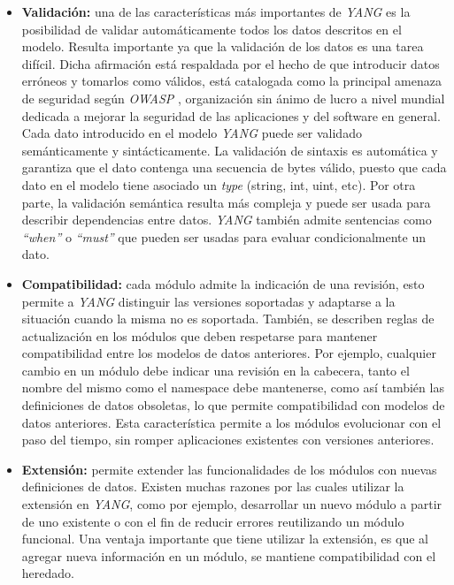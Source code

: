   \begin{itemize}
	\item \textbf{Validación:} una de las características más importantes de \textit{YANG} es la posibilidad de validar automáticamente todos los datos descritos en el modelo. Resulta importante ya que la validación de los datos es una tarea difícil. Dicha afirmación está respaldada por el hecho de que introducir datos erróneos y tomarlos como válidos, está catalogada como la principal amenaza de seguridad según \textit{OWASP} \parencite{owasp}, organización sin ánimo de lucro a nivel mundial dedicada a mejorar la seguridad de las aplicaciones y del software en general. Cada dato introducido en el modelo \textit{YANG} puede ser validado semánticamente y sintácticamente. La validación de sintaxis es automática y garantiza que el dato contenga una secuencia de bytes válido, puesto que cada dato en el modelo tiene asociado un \textit{type} (string, int, uint, etc). Por otra parte, la validación semántica resulta más compleja y puede ser usada para describir dependencias entre datos. \textit{YANG} también admite sentencias como \textit{“when”} o \textit{“must”} que pueden ser usadas para evaluar condicionalmente un dato.  
	\item \textbf{Compatibilidad:} cada módulo admite la indicación de una revisión, esto permite a \textit{YANG} distinguir las versiones soportadas y adaptarse a la situación cuando la misma no es soportada. También, se describen reglas de actualización en los módulos que deben respetarse para mantener compatibilidad entre los modelos de datos anteriores. Por ejemplo, cualquier cambio en un módulo debe indicar una revisión en la cabecera, tanto el nombre del mismo como el namespace debe mantenerse, como así también las definiciones de datos obsoletas, lo que permite compatibilidad con modelos de datos anteriores. Esta característica permite a los módulos evolucionar con el paso del tiempo, sin romper aplicaciones existentes con versiones anteriores.
	\item \textbf{Extensión:} permite extender las funcionalidades de los módulos con nuevas definiciones de datos. Existen muchas razones por las cuales utilizar la extensión en \textit{YANG}, como por ejemplo, desarrollar un nuevo módulo a partir de uno existente o con el fin de reducir errores reutilizando un módulo funcional. Una ventaja importante que tiene utilizar la extensión, es que al agregar nueva información en un módulo, se mantiene compatibilidad con el heredado.
\end{itemize}

